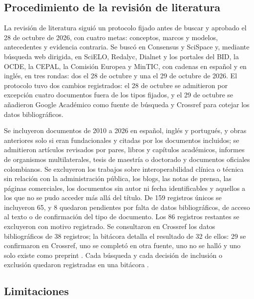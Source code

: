 \subsection{Procedimiento de la revisión de literatura}

La revisión de literatura siguió un protocolo fijado antes de buscar y aprobado el 28 de octubre de 2026, con cuatro metas: conceptos, marcos y modelos, antecedentes y evidencia contraria. Se buscó en Consensus y SciSpace y, mediante búsqueda web dirigida, en SciELO, Redalyc, Dialnet y los portales del BID, la OCDE, la CEPAL, la Comisión Europea y MinTIC, con cadenas en español y en inglés, en tres rondas: dos el 28 de octubre y una el 29 de octubre de 2026. El protocolo tuvo dos cambios registrados: el 28 de octubre se admitieron por excepción cuatro documentos fuera de los tipos fijados, y el 29 de octubre se añadieron Google Académico como fuente de búsqueda y Crossref para cotejar los datos bibliográficos.

Se incluyeron documentos de 2010 a 2026 en español, inglés y portugués, y obras anteriores solo si eran fundacionales y citadas por los documentos incluidos; se admitieron artículos revisados por pares, libros y capítulos académicos, informes de organismos multilaterales, tesis de maestría o doctorado y documentos oficiales colombianos. Se excluyeron los trabajos sobre interoperabilidad clínica o técnica sin relación con la administración pública, los blogs, las notas de prensa, las páginas comerciales, los documentos sin autor ni fecha identificables y aquellos a los que no se pudo acceder más allá del título. De 159 registros únicos se incluyeron 65, y 8 quedaron pendientes por falta de datos bibliográficos, de acceso al texto o de confirmación del tipo de documento. Los 86 registros restantes se excluyeron con motivo registrado. Se consultaron en Crossref los datos bibliográficos de 38 registros; la bitácora detalla el resultado de 32 de ellos: 29 se confirmaron en Crossref, uno se completó en otra fuente, uno no se halló y uno solo existe como preprint . Cada búsqueda y cada decisión de inclusión o exclusión quedaron registradas en una bitácora .

\subsection{Limitaciones}


